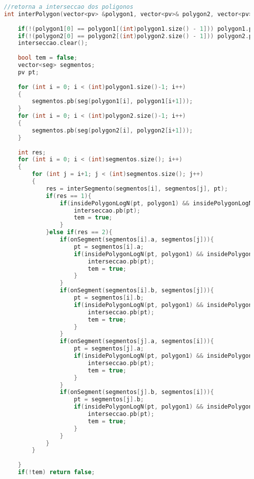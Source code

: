 \documentclass[12pt,a4paper, twoside]{report}
\begin{document}
\begin{lstlisting}[caption=Funções de polígono,language=C++]
//retorna a interseccao dos poligonos 
int interPolygon(vector<pv> &polygon1, vector<pv>& polygon2, vector<pv> &interseccao){
    
    if(!(polygon1[0] == polygon1[(int)polygon1.size() - 1])) polygon1.pb(polygon1[0]);
    if(!(polygon2[0] == polygon2[(int)polygon2.size() - 1])) polygon2.pb(polygon2[0]);
    interseccao.clear();
    
    bool tem = false;
    vector<seg> segmentos;
    pv pt;
    
    for (int i = 0; i < (int)polygon1.size()-1; i++)
    {
        segmentos.pb(seg(polygon1[i], polygon1[i+1]));
    }
    for (int i = 0; i < (int)polygon2.size()-1; i++)
    {
        segmentos.pb(seg(polygon2[i], polygon2[i+1]));
    }
    
    int res;
    for (int i = 0; i < (int)segmentos.size(); i++)
    {
        for (int j = i+1; j < (int)segmentos.size(); j++)
        {
            res = interSegmento(segmentos[i], segmentos[j], pt);
            if(res == 1){
                if(insidePolygonLogN(pt, polygon1) && insidePolygonLogN(pt, polygon2)){
                    interseccao.pb(pt);
                    tem = true;
                }
            }else if(res == 2){
                if(onSegment(segmentos[i].a, segmentos[j])){
                    pt = segmentos[i].a;
                    if(insidePolygonLogN(pt, polygon1) && insidePolygonLogN(pt, polygon2)){
                        interseccao.pb(pt);
                        tem = true;
                    }
                }
                if(onSegment(segmentos[i].b, segmentos[j])){
                    pt = segmentos[i].b;
                    if(insidePolygonLogN(pt, polygon1) && insidePolygonLogN(pt, polygon2)){
                        interseccao.pb(pt);
                        tem = true;
                    }
                }
                if(onSegment(segmentos[j].a, segmentos[i])){
                    pt = segmentos[j].a;
                    if(insidePolygonLogN(pt, polygon1) && insidePolygonLogN(pt, polygon2)){
                        interseccao.pb(pt);
                        tem = true;
                    }
                }
                if(onSegment(segmentos[j].b, segmentos[i])){
                    pt = segmentos[j].b;
                    if(insidePolygonLogN(pt, polygon1) && insidePolygonLogN(pt, polygon2)){
                        interseccao.pb(pt);
                        tem = true;
                    }
                }
            }
        }
        
    }
    if(!tem) return false;
    

\end{lstlisting}
\end{document}
